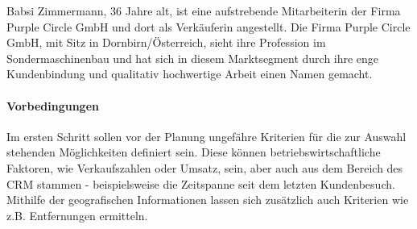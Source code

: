 \documentclass[Bachelorarbeit.tex]{subfiles}
\begin{document}
Babsi Zimmermann, 36 Jahre alt, ist eine aufstrebende Mitarbeiterin der Firma Purple Circle GmbH und dort als Verkäuferin angestellt. 
Die Firma Purple Circle GmbH, mit Sitz in Dornbirn/Österreich, sieht ihre Profession im Sondermaschinenbau und hat sich in diesem Marktsegment durch ihre enge Kundenbindung und qualitativ hochwertige Arbeit einen Namen gemacht. 


\paragraph*{Vorbedingungen}
Im ersten Schritt sollen vor der Planung ungefähre Kriterien für die zur Auswahl stehenden Möglichkeiten definiert sein.
Diese können betriebswirtschaftliche Faktoren, wie Verkaufszahlen oder Umsatz, sein, aber auch aus dem Bereich des \ac{CRM} stammen - beispielsweise die Zeitspanne seit dem letzten Kundenbesuch.
Mithilfe der geografischen Informationen lassen sich zusätzlich auch Kriterien wie z.B. Entfernungen ermitteln.
\end{document}
